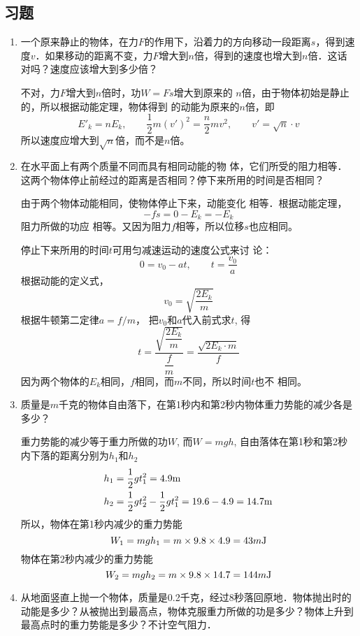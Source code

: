\subsection{习题}
\begin{enumerate}
    \item 一个原来静止的物体，在力$F$的作用下，沿着力的方向移动一段距离$s$，得到速度$v$．如果移动的距离不变，力$F$增大到$n$倍，得到的速度也增大到$n$倍．这话对吗？速度应该增大到多少倍？

    \begin{solution}
        不对，力$F$增大到$n$倍时，功$W=Fs$增大到原来的
        $n$倍，由于物体初始是静止的，所以根据动能定理，物体得到
        的动能为原来的$n$倍，即
        \[E'_k=nE_k,\qquad \frac{1}{2}m(v')^2=\frac{n}{2}mv^2,\qquad v'=\sqrt{n}\cdot v\]
  所以速度应增大到$\sqrt{n}$倍，而不是$n$倍。
    \end{solution}
    \item 在水平面上有两个质量不同而具有相同动能的物
体，它们所受的阻力相等．这两个物体停止前经过的距离是否相同？停下来所用的时间是否相同？

\begin{solution}
由于两个物体动能相同，使物体停止下来，动能变化
相等．根据动能定理，
\[-fs=0-E_k=-E_k\]
阻力所做的功应
相等。又因为阻力$f$相等，所以位移$s$也应相同。

停止下来所用的时间$t$可用匀减速运动的速度公式来讨
论：
\[0=v_0-at,\qquad t=\frac{v_0}{a}\]
根据动能的定义式，
\[v_0=\sqrt{\frac{2E_k}{m}}\]
根据牛顿第二定律$a=f/m$，
把$v_0$和$a$代入前式求$t$, 得
\[t=\frac{\sqrt{\dfrac{2E_k}{m}}}{\dfrac{f}{m}}=\frac{\sqrt{2E_k\cdot m}}{f}\]
因为两个物体的$E_k$相同，$f$相同，而$m$不同，所以时间$t$也不
相同。
\end{solution}
\item 质量是$m$千克的物体自由落下，在第1秒内和第2秒内物体重力势能的减少各是多少？

\begin{solution}
重力势能的减少等于重力所做的功$W$, 而$W=mgh$, 
自由落体在第1秒和第2秒内下落的距离分别为$h_1$和$h_2$
\[\begin{split}
    h_1&=\frac{1}{2}gt_1^2=4.9{\rm m}\\
    h_2&=\frac{1}{2}gt_2^2-\frac{1}{2}gt_1^2=19.6-4.9=14.7{\rm m}
\end{split}\]
所以，物体在第1秒内减少的重力势能
\[W_1=mgh_1=m\times9.8\times4.9=43m{\rm J}\]
物体在第2秒内减少的重力势能
\[W_2=mgh_2=m\times9.8\times14.7=144m{\rm J}\]
\end{solution}
\item 从地面竖直上抛一个物体，质量是0.2千克，经过8秒落回原地．物体抛出时的动能是多少？从被抛出到最高点，物体克服重力所做的功是多少？物体上升到最高点时的重力势能是多少？不计空气阻力．


\end{enumerate}
